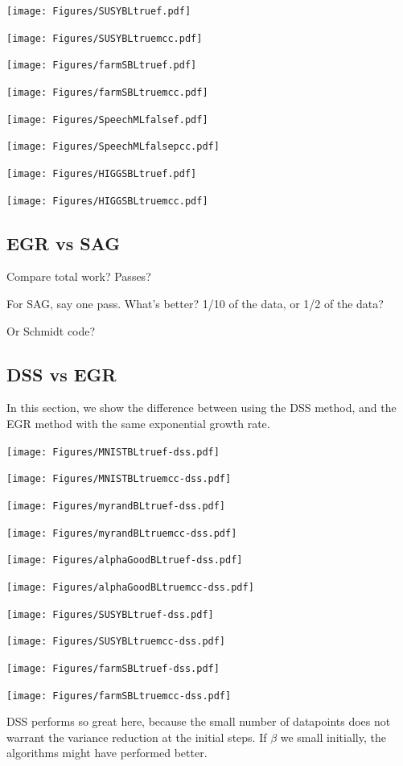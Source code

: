\documentclass[11pt]{article}
\begin{document}
\texttt{[image: Figures/SUSYBLtruef.pdf]} 

\texttt{[image: Figures/SUSYBLtruemcc.pdf]} 

\texttt{[image: Figures/farmSBLtruef.pdf]} 

\texttt{[image: Figures/farmSBLtruemcc.pdf]} 

\texttt{[image: Figures/SpeechMLfalsef.pdf]} 

\texttt{[image: Figures/SpeechMLfalsepcc.pdf]} 

\texttt{[image: Figures/HIGGSBLtruef.pdf]} 

\texttt{[image: Figures/HIGGSBLtruemcc.pdf]} 

\subsection{EGR vs SAG}

Compare total work? Passes?

For SAG, say one pass. What's better? 1/10 of the data, or 1/2 of the data?

Or Schmidt code?

\subsection{DSS vs EGR}

In this section, we show the difference between using the DSS method, and the EGR method with the same exponential growth rate.

\newpage 

\texttt{[image: Figures/MNISTBLtruef-dss.pdf]}

\texttt{[image: Figures/MNISTBLtruemcc-dss.pdf]}

\texttt{[image: Figures/myrandBLtruef-dss.pdf]}

\texttt{[image: Figures/myrandBLtruemcc-dss.pdf]}

\texttt{[image: Figures/alphaGoodBLtruef-dss.pdf]}

\texttt{[image: Figures/alphaGoodBLtruemcc-dss.pdf]}

\texttt{[image: Figures/SUSYBLtruef-dss.pdf]}

\texttt{[image: Figures/SUSYBLtruemcc-dss.pdf]}

\texttt{[image: Figures/farmSBLtruef-dss.pdf]}

\texttt{[image: Figures/farmSBLtruemcc-dss.pdf]}

DSS performs so great here, because the small number of datapoints does not warrant the variance reduction at the initial steps. If $\beta$ we small initially, the algorithms might have performed better. 
\end{document}

